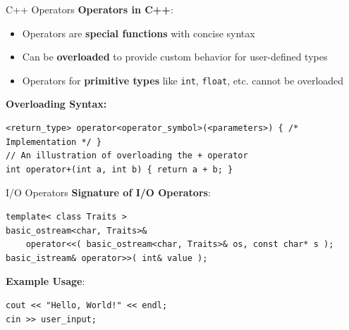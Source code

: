 \begin{frame}[fragile]{ C++ Operators}
    \textbf{Operators in C++}:
    \begin{itemize}
        \item Operators are \textbf{special functions} with concise syntax
        \item Can be \textbf{overloaded} to provide custom behavior for user-defined types
        \item Operators for \textbf{primitive types} like \texttt{int}, \texttt{float}, etc. cannot be overloaded
    \end{itemize}

    \textbf{Overloading Syntax:}
    \begin{verbatim}
<return_type> operator<operator_symbol>(<parameters>) { /* Implementation */ }
// An illustration of overloading the + operator
int operator+(int a, int b) { return a + b; }
    \end{verbatim}
\end{frame}

\begin{frame}[fragile]{ I/O Operators}
    \textbf{Signature of I/O Operators}:
    \begin{verbatim}
template< class Traits >
basic_ostream<char, Traits>&
    operator<<( basic_ostream<char, Traits>& os, const char* s );
basic_istream& operator>>( int& value );
    \end{verbatim}
    \textbf{Example Usage}:
    \begin{verbatim}
cout << "Hello, World!" << endl;
cin >> user_input;
    \end{verbatim}
\end{frame}


